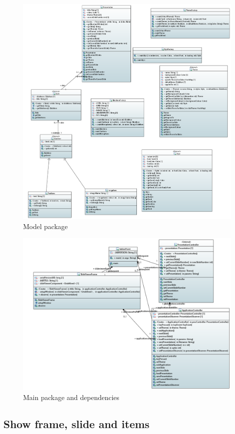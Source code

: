 \documentclass[a4paper]{article}
\begin{document}
\begin{figure}[!htpb]
  \includegraphics[width=\linewidth]{Model.png}
  \caption{Model package}
  \label{fig:packdiag}
\end{figure}

\begin{figure}[!htpb]
  \includegraphics[width=\linewidth]{Main.png}
  \caption{Main package and dependencies}
  \label{fig:packdiag}
\end{figure}
\subsection{Show frame, slide and items}
\end{document}

